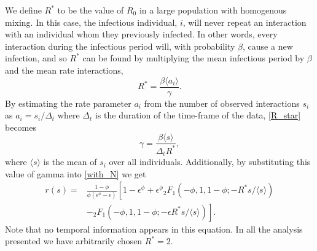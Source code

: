 \documentclass[twocolumn,8pt]{article}
\begin{document}
We define $R^{*}$ to be the value of $R_{0}$ in a large population with homogenous mixing. In this case, the infectious individual, $i$, will never repeat an interaction with an individual whom they previously infected. In other words, every interaction during the infectious period will, with probability $\beta$, cause a new infection, and so $R^{*}$ can be found by multiplying the mean infectious period by $\beta$ and the mean rate interactions,
\begin{equation}
\label{R_star}
R^{*}=\frac{\beta\langle a_{i}\rangle}{\gamma}.
\end{equation}
By estimating the rate parameter $a_{i}$ from the number of observed interactions $s_{i}$ as $a_{i}=s_{i}/\Delta_t$ where $\Delta_{t}$ is the duration of the time-frame of the data, \eqref{R_star} becomes
\begin{equation}
\label{gamma}
\gamma=\frac{\beta\langle s\rangle}{\Delta_{t} R^{*}},
\end{equation}
where $\langle s\rangle$ is the mean of $s_{i}$ over all individuals. Additionally, by substituting this value of gamma into \eqref{with_N} we get
\begin{equation}
\label{calibrated}
\begin{split}
r(s)=&\frac{1-\phi}{\phi(\epsilon^{\phi}-\epsilon)}\left[1-\epsilon^{\phi}+\epsilon^{\phi}{}_{2}F_{1}(-\phi,1,1-\phi;-R^{*}s/\langle s \rangle)\right.\\[10pt]
&\left.-{}_{2}F_{1}(-\phi,1,1-\phi;-\epsilon R^{*}s/\langle s \rangle)\right].
\end{split}
\end{equation}
Note that no temporal information appears in this equation. In all the analysis presented we have arbitrarily chosen $R^{*}=2$. 
\end{document}
